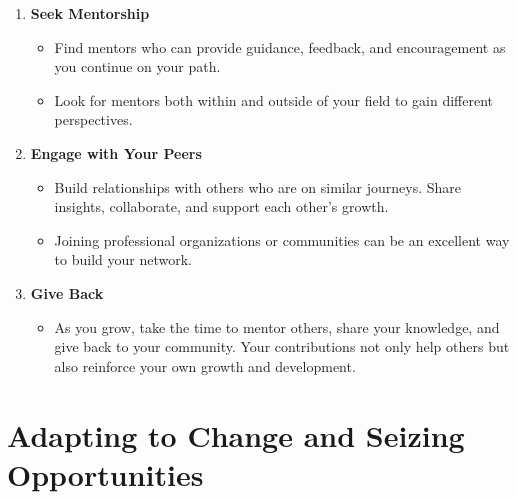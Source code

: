 \documentclass[
  letterpaper,
  DIV=11,
  numbers=noendperiod]{scrreprt}
\providecommand{\tightlist}{%
  \setlength{\itemsep}{0pt}\setlength{\parskip}{0pt}}\usepackage{longtable,booktabs,array}
\begin{document}
\begin{enumerate}
\def\labelenumi{\arabic{enumi}.}
\item
  \textbf{Seek Mentorship}

  \begin{itemize}
  \tightlist
  \item
    Find mentors who can provide guidance, feedback, and encouragement
    as you continue on your path.
  \item
    Look for mentors both within and outside of your field to gain
    different perspectives.
  \end{itemize}
\item
  \textbf{Engage with Your Peers}

  \begin{itemize}
  \tightlist
  \item
    Build relationships with others who are on similar journeys. Share
    insights, collaborate, and support each other's growth.
  \item
    Joining professional organizations or communities can be an
    excellent way to build your network.
  \end{itemize}
\item
  \textbf{Give Back}

  \begin{itemize}
  \tightlist
  \item
    As you grow, take the time to mentor others, share your knowledge,
    and give back to your community. Your contributions not only help
    others but also reinforce your own growth and development.
  \end{itemize}
\end{enumerate}

\section{Adapting to Change and Seizing
Opportunities}\label{adapting-to-change-and-seizing-opportunities}
\end{document}
